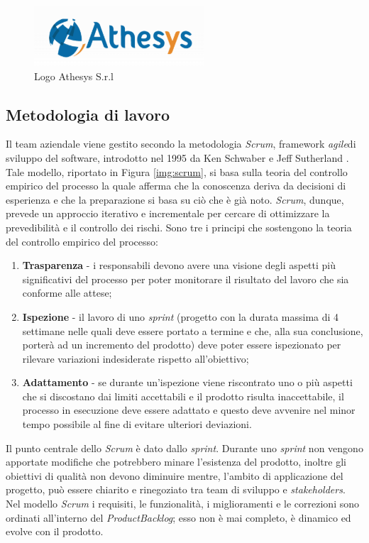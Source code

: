 \begin{figure}[!h]
	\centering
	\includegraphics{immagini/logo_athesys}
	\caption{Logo Athesys S.r.l}
	\label{img:logoAthesys}
\end{figure}

\subsection{Metodologia di lavoro}

Il team aziendale viene gestito secondo la metodologia \emph{\gls{Scrum}}\glsfirstoccur, framework \emph{\gls{agile}}\glsfirstoccur di sviluppo del software, introdotto nel 1995 da Ken Schwaber e Jeff Sutherland \cite{manifestoAgile}. Tale modello, riportato in Figura \ref{img:scrum}, si basa sulla teoria del controllo empirico del processo la quale afferma che la conoscenza deriva da decisioni di esperienza e che la preparazione si basa su ciò che è già noto. \textit{Scrum}, dunque, prevede un approccio iterativo e incrementale per cercare di ottimizzare la prevedibilità e il controllo dei rischi. Sono tre i principi che sostengono la teoria del controllo empirico del processo:
\begin{enumerate}
	\item \textbf{Trasparenza} - i responsabili devono avere una visione degli aspetti più significativi del processo per poter monitorare il risultato del lavoro che sia conforme alle attese;
	\item \textbf{Ispezione} - il lavoro di uno \textit{sprint} (progetto con la durata massima di 4 settimane nelle quali deve essere portato a termine e che, alla sua conclusione, porterà ad un incremento del prodotto) deve poter essere ispezionato per rilevare variazioni indesiderate rispetto all'obiettivo;
	\item \textbf{Adattamento} - se durante un'ispezione viene riscontrato uno o più aspetti che si discostano dai limiti accettabili e il prodotto risulta inaccettabile, il processo in esecuzione deve essere adattato e questo deve avvenire nel minor tempo possibile al fine di evitare ulteriori deviazioni.
\end{enumerate}
Il punto centrale dello \textit{Scrum} è dato dallo \textit{sprint}. Durante uno \textit{sprint} non vengono apportate modifiche che potrebbero minare l'esistenza del prodotto, inoltre gli obiettivi di qualità non devono diminuire mentre, l'ambito di applicazione del progetto, può essere chiarito e rinegoziato tra team di sviluppo e \textit{stakeholders}. Nel modello \textit{Scrum} i requisiti, le funzionalità, i miglioramenti e le correzioni sono ordinati all'interno del \emph{\gls{ProductBacklog}}\glsfirstoccur; esso non è mai completo, è dinamico ed evolve con il prodotto.\\
